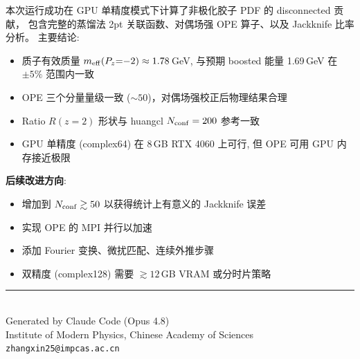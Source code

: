 \documentclass[12pt,a4paper]{ctexart}
\begin{document}
本次运行成功在 GPU 单精度模式下计算了非极化胶子 PDF 的 disconnected 贡献，
包含完整的蒸馏法 2pt 关联函数、对偶场强 OPE 算子、以及 Jackknife 比率分析。
主要结论:

\begin{itemize}
  \item 质子有效质量 $m_{\rm eff}(P_z{=}{-}2) \approx 1.78$\,GeV,
  与预期 boosted 能量 1.69\,GeV 在 $\pm 5\%$ 范围内一致
  \item OPE 三个分量量级一致 ($\sim 50$)，对偶场强校正后物理结果合理
  \item Ratio $R(z{=}2)$ 形状与 huangcl $N_{\rm conf}=200$ 参考一致
  \item GPU 单精度 (complex64) 在 8\,GB RTX 4060 上可行, 但 OPE 可用 GPU 内存接近极限
\end{itemize}

\noindent
\textbf{后续改进方向}:
\begin{itemize}
  \item 增加到 $N_{\rm conf} \gtrsim 50$ 以获得统计上有意义的 Jackknife 误差
  \item 实现 OPE 的 MPI 并行以加速
  \item 添加 Fourier 变换、微扰匹配、连续外推步骤
  \item 双精度 (complex128) 需要 $\gtrsim 12$\,GB VRAM 或分时片策略
\end{itemize}

\vspace{12pt}
\begin{center}
\rule{0.5\textwidth}{0.4pt} \\[4pt]
{\small
Generated by Claude Code (Opus 4.8) \\
Institute of Modern Physics, Chinese Academy of Sciences \\
\texttt{zhangxin25@impcas.ac.cn}
}
\end{center}
\end{document}
